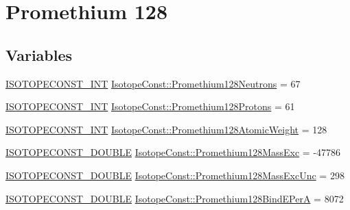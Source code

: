 \hypertarget{group___isotope_const-_promethium-_pm128}{}\section{Promethium 128}
\label{group___isotope_const-_promethium-_pm128}
\subsection*{Variables}
\begin{DoxyCompactItemize}
\item 
\mbox{\hyperlink{group___isotope_const-_macros_ga5f18360b3e99483a35c32d789e62621c}{I\+S\+O\+T\+O\+P\+E\+C\+O\+N\+S\+T\+\_\+\+I\+NT}} \mbox{\hyperlink{group___isotope_const-_promethium-_pm128_ga222323d0c1266d82069f1f92bb0c78e3}{Isotope\+Const\+::\+Promethium128\+Neutrons}} = 67
\item 
\mbox{\hyperlink{group___isotope_const-_macros_ga5f18360b3e99483a35c32d789e62621c}{I\+S\+O\+T\+O\+P\+E\+C\+O\+N\+S\+T\+\_\+\+I\+NT}} \mbox{\hyperlink{group___isotope_const-_promethium-_pm128_gaee331929fa5933dd52dfcfe98c6f9fd0}{Isotope\+Const\+::\+Promethium128\+Protons}} = 61
\item 
\mbox{\hyperlink{group___isotope_const-_macros_ga5f18360b3e99483a35c32d789e62621c}{I\+S\+O\+T\+O\+P\+E\+C\+O\+N\+S\+T\+\_\+\+I\+NT}} \mbox{\hyperlink{group___isotope_const-_promethium-_pm128_ga024e927ef36c85a04059628036e5d343}{Isotope\+Const\+::\+Promethium128\+Atomic\+Weight}} = 128
\item 
\mbox{\hyperlink{group___isotope_const-_macros_ga8f45a7272ce02c0b4c65c44636ed719a}{I\+S\+O\+T\+O\+P\+E\+C\+O\+N\+S\+T\+\_\+\+D\+O\+U\+B\+LE}} \mbox{\hyperlink{group___isotope_const-_promethium-_pm128_ga453f980a74d9aab7dc483d482a131372}{Isotope\+Const\+::\+Promethium128\+Mass\+Exc}} = -\/47786
\item 
\mbox{\hyperlink{group___isotope_const-_macros_ga8f45a7272ce02c0b4c65c44636ed719a}{I\+S\+O\+T\+O\+P\+E\+C\+O\+N\+S\+T\+\_\+\+D\+O\+U\+B\+LE}} \mbox{\hyperlink{group___isotope_const-_promethium-_pm128_gaf9e8533ad8899aa0ea06b29b62c3ebf6}{Isotope\+Const\+::\+Promethium128\+Mass\+Exc\+Unc}} = 298
\item 
\mbox{\hyperlink{group___isotope_const-_macros_ga8f45a7272ce02c0b4c65c44636ed719a}{I\+S\+O\+T\+O\+P\+E\+C\+O\+N\+S\+T\+\_\+\+D\+O\+U\+B\+LE}} \mbox{\hyperlink{group___isotope_const-_promethium-_pm128_gaaca23352fedcbc7ee082442598e4b3b7}{Isotope\+Const\+::\+Promethium128\+Bind\+E\+PerA}} = 8072
\item 

\end{DoxyCompactItemize}
